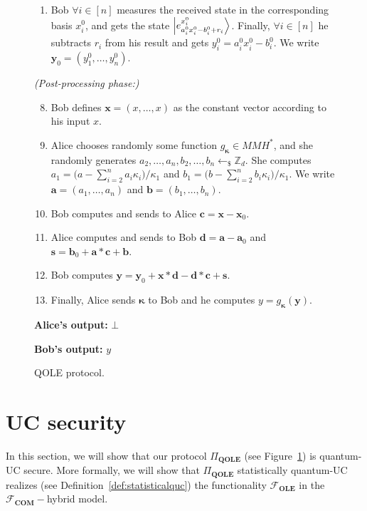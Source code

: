 \begin{figure}[h!]
\begin{tcolorbox}
\begin{enumerate}
        \item Bob  $\forall i\in [n]$ measures the received state in the corresponding basis  $x^0_i$, and gets the state $\ket{e^{x^0_i}_{a^0_i x^0_i - b^0_i+r_i}}$. Finally,  $\forall i\in [n]$ he subtracts $r_i$ from his result and gets $y^0_i = a^0_i x^0_i - b^0_i$. We write $\bm{y}_0 = (y^0_1, \ldots, y^0_n)$. 
    \end{enumerate}
        
    \textit{(Post-processing phase:)}

    \begin{enumerate}
    \setcounter{enumi}{7} 
        \item Bob defines $\bm{x} = (x, \ldots,x)$ as the constant vector according to his input $x$.
        \item Alice chooses randomly some function $g_{\bm{\kappa}} \in MMH^*$, and she randomly generates $a_2, \ldots, a_n, b_2, \ldots, b_n\leftarrow_{\$}\mathbb{Z}_d$. She computes $a_1 = \big(a - \sum_{i=2}^{n} a_i \kappa_i\big)/\kappa_1$ and $b_1 = \big(b - \sum_{i=2}^{n} b_i \kappa_i\big)/\kappa_1$. We write $\bm{a} = (a_1, \ldots, a_n)$ and $\bm{b} = (b_1, \ldots, b_n)$.
        \item Bob computes and sends to Alice $\bm{c} = \bm{x} - \bm{x}_0$.
        \item Alice computes and sends  to Bob $\bm{d} = \bm{a} - \bm{a}_0$ and $\bm{s} = \bm{b}_0 + \bm{a}  * \bm{c} + \bm{b}$.
        \item Bob computes $\bm{y} = \bm{y}_0 + \bm{x} * \bm{d} - \bm{d}* \bm{c} + \bm{s}$.
        \item Finally, Alice sends $\bm{\kappa}$ to Bob and he computes $y = g_{\bm{\kappa}}(\bm{y})$.
    \end{enumerate}


\textbf{Alice's output:} $\bot$

\textbf{Bob's output:} $y$
        
        \end{tcolorbox}
\caption{QOLE protocol.}
\label{fig:fullprotocol}
\end{figure}



\section{UC security}\label{secureQROLE_protocol}


In this section, we will show that our protocol  $\Pi_{\textbf{QOLE}}$ (see Figure~\ref{fig:fullprotocol}) is quantum-UC secure. More formally, we will show that $\Pi_{\textbf{QOLE}}$  statistically quantum-UC realizes  (see Definition~\ref{def:statisticalquc}) the functionality $\mathcal{F}_{\textbf{OLE}}$ in the $\mathcal{F}_{\textbf{COM}}-$hybrid model.

